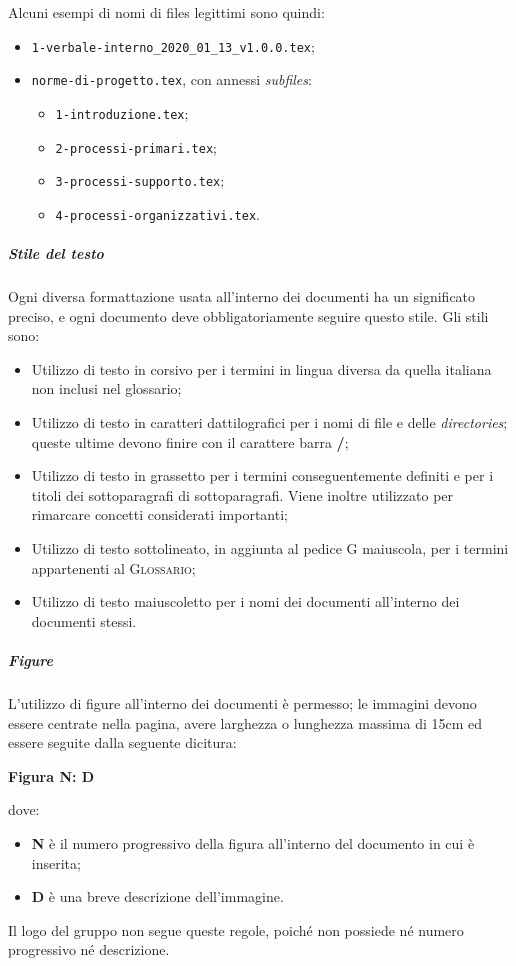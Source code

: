 \documentclass[../norme-di-progetto.tex]{subfiles}
\begin{document}
Alcuni esempi di nomi di files legittimi sono quindi:
\begin{itemize}
  \item \texttt{1-verbale-interno\_2020\_01\_13\_v1.0.0.tex};
  \item \texttt{norme-di-progetto.tex}, con annessi \textit{subfiles}:
    \begin{itemize}
      \item \texttt{1-introduzione.tex};
      \item \texttt{2-processi-primari.tex};
      \item \texttt{3-processi-supporto.tex};
      \item \texttt{4-processi-organizzativi.tex}.
    \end{itemize}
\end{itemize}

\subparagraph{Stile del testo}
Ogni diversa formattazione usata all'interno dei documenti ha un significato preciso, e ogni documento deve obbligatoriamente seguire questo stile. Gli stili sono:
\begin{itemize}
  \item Utilizzo di testo in corsivo per i termini in lingua diversa da quella italiana non inclusi nel glossario;
  \item Utilizzo di testo in caratteri dattilografici per i nomi di file e delle \textit{directories}; queste ultime devono finire con il carattere barra \textbf{/};
  \item Utilizzo di testo in grassetto per i termini conseguentemente definiti e per i titoli dei sottoparagrafi di sottoparagrafi. Viene inoltre utilizzato per rimarcare concetti considerati importanti;
  \item Utilizzo di testo sottolineato, in aggiunta al pedice G maiuscola, per i termini appartenenti al \textsc{Glossario};
  \item Utilizzo di testo maiuscoletto per i nomi dei documenti all'interno dei documenti stessi.
\end{itemize}

\subparagraph{Figure}
L'utilizzo di figure all'interno dei documenti è permesso; le immagini devono essere centrate nella pagina, avere larghezza o lunghezza massima di 15cm ed essere seguite dalla seguente dicitura: \\ \begin{center}
  \centering
  \textbf{Figura N: D}
\end{center} dove:
\begin{itemize}
  \item \textbf{N} è il numero progressivo della figura all'interno del documento in cui è inserita;
  \item \textbf{D} è una breve descrizione dell'immagine.
\end{itemize}
Il logo del gruppo non segue queste regole, poiché non possiede né numero progressivo né descrizione.
\end{document}
